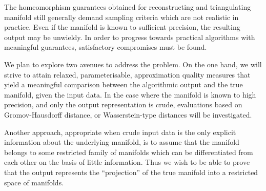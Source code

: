The homeomorphism guarantees obtained for reconstructing and
triangulating manifold still generally demand sampling criteria which
are not realistic in practice. Even if the manifold is known to
sufficient precision, the resulting output may be
unwieldy. In order to progress towards practical algorithms with
meaningful guarantees, satisfactory compromises must be found. 
%
%

We plan to explore two avenues to address the problem. On the one
hand, we will strive to attain relaxed, parameterisable, approximation quality
measures that yield a meaningful comparison between the algorithmic
output and the true manifold, given the input data. In the case where
the manifold is known to high precision, and only the output
representation is crude, evaluations based on Gromov-Hausdorff
distance, or Wasserstein-type distances will be investigated.

Another approach, appropriate when crude input data is the only
explicit information about the underlying manifold, is to assume that
the manifold belongs to some restricted family of manifolds which can
be differentiated from each other on the basis of little
information. Thus we wish to be able to prove that the output
represents the ``projection'' of the true manifold into a restricted
space of manifolds.

